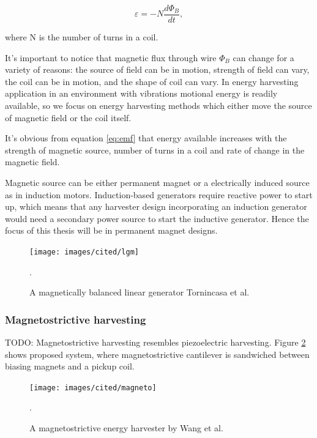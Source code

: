 \begin{equation} \label{eq:emf}
  \varepsilon = -N \frac{d \Phi_{B}}{d t} , 
\end{equation}

where N is the number of turns in a coil. \cite[p.999]{universityphysics}

It's important to notice that magnetic flux through wire $ \Phi_{B} $ can change for a variety of reasons: the source of field can be in motion, strength of field can vary, the coil can be in motion, and the shape of coil can vary. In energy harvesting application in an environment with vibrations motional energy is readily available, so we focus on energy harvesting methods which either move the source of magnetic field or the coil itself.

It's obvious from equation \eqref{eq:emf} that energy available increases with the strength of magnetic source, number of turns in a coil and rate of change in the magnetic field. 

Magnetic source can be either permanent magnet or a electrically induced source as in induction motors. Induction-based generators require reactive power to start up, which means that any harvester design incorporating an induction generator would need a secondary power source to start the inductive generator. Hence the focus of this thesis will be in permanent magnet designs.



\begin{figure}[htb]
\begin{center}
\texttt{[image: images/cited/lgm]}
\end{center}
\caption{A magnetically balanced linear generator Tornincasa et al. \cite{Tornincasa2012}}.
\label{lgm}
\end{figure}

\subsubsection{Magnetostrictive harvesting}
TODO: Magnetostrictive harvesting resembles piezoelectric harvesting. Figure \ref{magneto} shows proposed system, where magnetostrictive cantilever is sandwiched between biasing magnets and a pickup coil.  

\begin{figure}[htb]
\begin{center}
\texttt{[image: images/cited/magneto]}
\end{center}
\caption{A magnetostrictive energy harvester by Wang et al. \cite{Wang2006}}.
\label{magneto}
\end{figure}

